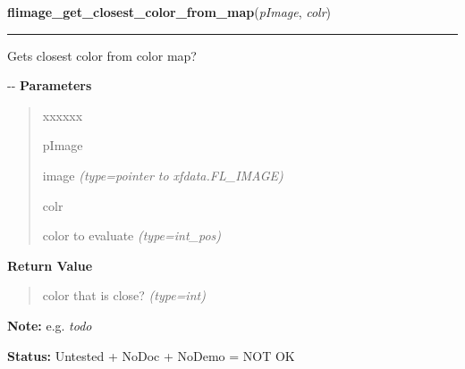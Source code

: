 \hspace{.8\funcindent}\begin{boxedminipage}{\funcwidth}

    \raggedright \textbf{flimage\_get\_closest\_color\_from\_map}(\textit{pImage}, \textit{colr})

    \vspace{-1.5ex}

    \rule{\textwidth}{0.5\fboxrule}
\setlength{\parskip}{2ex}

Gets closest color from color map?

-{}-
\setlength{\parskip}{1ex}
      \textbf{Parameters}
      \vspace{-1ex}

      \begin{quote}
        \begin{Ventry}{xxxxxx}

          \item[pImage]


image
            {\it (type=pointer to xfdata.FL\_IMAGE)}

          \item[colr]


color to evaluate
            {\it (type=int\_pos)}

        \end{Ventry}

      \end{quote}

      \textbf{Return Value}
    \vspace{-1ex}

      \begin{quote}

color that is close?
      {\it (type=int)}

      \end{quote}

\textbf{Note:} 
e.g. \emph{todo}


\textbf{Status:} 
Untested + NoDoc + NoDemo = NOT OK


    \end{boxedminipage}

    \label{xformslib:flflimage:flimage_get_linearlut}

    \vspace{0.5ex}

